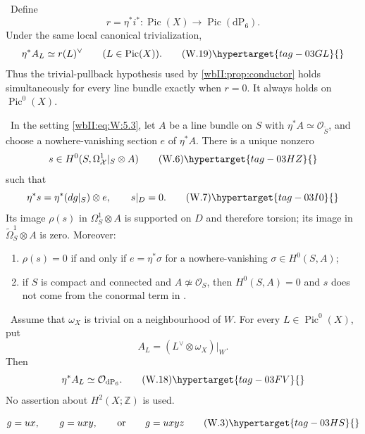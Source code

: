 
\begin{proposition}
\hypertarget{tag-03IG}{}\label{wbII:prop:all-pic-restriction}


\ Define
\[
 r=\eta^*i^*:\operatorname{Pic}(X)\longrightarrow
 \operatorname{Pic}(\mathrm{dP}_6).
\]
Under the same local canonical trivialization,
\[
 \eta^*A_L\simeq r(L)^\vee
 \qquad(L\in\operatorname{Pic}(X)).
\tag{W.19}\hypertarget{tag-03GL}{}\label{wbII:eq:W:5.17b}
\]
Thus the trivial-pullback hypothesis used by
\cref{wbII:prop:conductor} holds simultaneously for every line bundle exactly
when $r=0$.  It always holds on $\operatorname{Pic}^0(X)$.
\end{proposition}

\begin{theorem}
\hypertarget{tag-03IK}{}\label{wbII:prop:conductor}

\label{wbII:prop:conductor-differential}
\ In the setting \eqref{wbII:eq:W:5.3}, let $A$ be a line bundle on $S$ with
$\eta^*A\simeq\mathcal O_{\widetilde S}$, and choose a nowhere-vanishing
section $e$ of $\eta^*A$.  There is a unique nonzero
\[
s\in H^0(S,\Omega^1_{\mathcal X}|_S\otimes A)
\tag{W.6}\hypertarget{tag-03HZ}{}\label{wbII:eq:W:5.6}
\]
such that
\[
\eta^*s=\eta^*(dg|_S)\otimes e,\qquad s|_D=0.
\tag{W.7}\hypertarget{tag-03I0}{}\label{wbII:eq:W:5.7}
\]
Its image $\rho(s)$ in $\Omega^1_S\otimes A$ is supported on $D$ and
therefore torsion; its image in
$\widetilde\Omega^1_S\otimes A$ is zero.  Moreover:
\begin{enumerate}[label=(\alph*)]
\item $\rho(s)=0$ if and only if $e=\eta^*\sigma$ for a nowhere-vanishing
$\sigma\in H^0(S,A)$;
\item if $S$ is compact and connected and $A\not\simeq\mathcal O_S$, then
$H^0(S,A)=0$ and $s$ does not come from the conormal term in .
\end{enumerate}
\end{theorem}

\begin{proposition}
\hypertarget{tag-03IO}{}\label{wbII:prop:pic0-pullback}


\ Assume that $\omega_X$ is trivial on a neighbourhood of $W$.
For every $L\in\operatorname{Pic}^0(X)$, put
\[
 A_L=(L^\vee\otimes\omega_X)|_W.
\]
Then
\[
 \eta^*A_L\simeq\mathcal O_{\mathrm{dP}_6}.
\tag{W.18}\hypertarget{tag-03FV}{}\label{wbII:eq:W:5.17a}
\]
No assertion about $H^2(X;\mathbb Z)$ is used.
\end{proposition}

\[
g=ux,\qquad g=uxy,\qquad\text{or}\qquad g=uxyz
\tag{W.3}\hypertarget{tag-03HS}{}\label{wbII:eq:W:5.3}
\]

